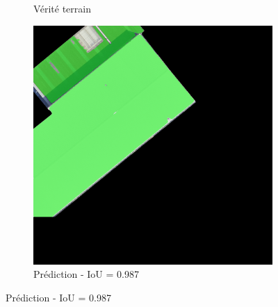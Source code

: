 \begin{figure}[H]
\begin{subfigure}{0.32\textwidth}
    \caption{Vérité terrain}
\end{subfigure}
\hfill
\begin{subfigure}{0.32\textwidth}
    \includegraphics[width=\textwidth]{02-main//figures/ch4/kfold_ensembles/unetplusplus_tu-efficientnetv2_rw_s.ra2_in1k/best_cases/best_3_iou0.987_24931117_tile_18_5_f475a0_overlay_pred.png}
    \caption{Prédiction - IoU = 0.987}
\end{subfigure}

\vspace{0.35cm}


\end{figure}
